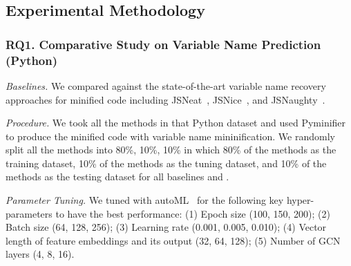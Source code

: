 \subsection{Experimental Methodology}
\label{empirical-method}

\subsubsection{RQ1. Comparative Study on Variable Name Prediction (Python)\\}
{\em Baselines.} We compared {\tool} against the state-of-the-art
variable name recovery approaches for minified code including
JSNeat~\cite{icse19}, JSNice~\cite{JSNice2015}, and
JSNaughty~\cite{JSNaughty2017}.

\textit{Procedure.} We took all the methods in that Python dataset
and used Pyminifier to produce the minified code with variable name
mininification. We randomly split all the methods into 80\%, 10\%,
10\% in which 80\% of the methods as the training dataset, 10\% of the
methods as the tuning dataset, and 10\% of the methods as the testing
dataset for all baselines and {\tool}.


{\em Parameter Tuning.} We tuned {\tool} with autoML~\cite{NNI} for
the following key hyper-parameters to have the best performance: (1)
Epoch size (100, 150, 200); (2) Batch size (64, 128, 256); (3)
Learning rate (0.001, 0.005, 0.010); (4) Vector length of feature
embeddings and its output (32, 64, 128); (5) Number of GCN layers (4,
8, 16).

{}

